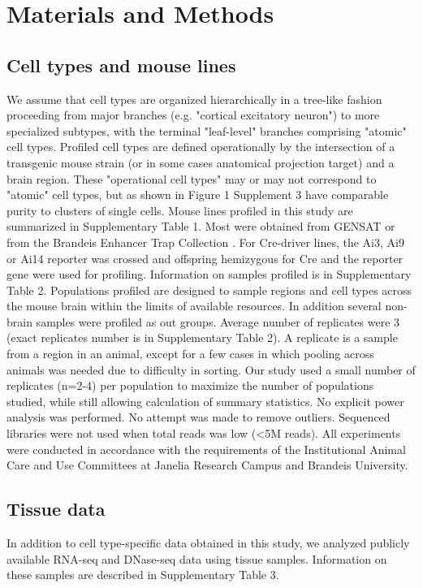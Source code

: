 \section{Materials and Methods}

\subsection{Cell types and mouse lines}
We assume that cell types are organized hierarchically in a tree-like fashion proceeding from major branches (e.g. "cortical excitatory neuron") to more specialized subtypes, with the terminal "leaf-level" branches comprising "atomic" cell types. Profiled cell types are defined operationally by the intersection of a transgenic mouse strain (or in some cases anatomical projection target) and a brain region. These "operational cell types" may or may not correspond to "atomic" cell types, but as shown in Figure 1 Supplement 3 have comparable purity to clusters of single cells. Mouse lines profiled in this study are summarized in Supplementary Table 1. Most were obtained from GENSAT \citep{Gong_2007} or from the Brandeis Enhancer Trap Collection \citep{Shima_2016}. For Cre-driver lines, the Ai3, Ai9 or Ai14 reporter \citep{Madisen_2009} was crossed and offspring hemizygous for Cre and the reporter gene were used for profiling. Information on samples profiled is in Supplementary Table 2. Populations profiled are designed to sample regions and cell types across the mouse brain within the limits of available resources. In addition several non-brain samples were profiled as out groups. Average number of replicates were 3 (exact replicates number is in Supplementary Table 2). A replicate is a sample from a region in an animal, except for a few cases in which pooling across animals was needed due to difficulty in sorting. Our study used a small number of replicates (n=2-4) per population to maximize the number of populations studied, while still allowing calculation of summary statistics. No explicit power analysis was performed. No attempt was made to remove outliers. Sequenced libraries were not used when total reads was low (<5M reads). All experiments were conducted in accordance with the requirements of the Institutional Animal Care and Use Committees at Janelia Research Campus and Brandeis University.

\subsection{Tissue data}
In addition to cell type-specific data obtained in this study, we analyzed publicly available RNA-seq and DNase-seq data using tissue samples. Information on these samples are described in Supplementary Table 3.

